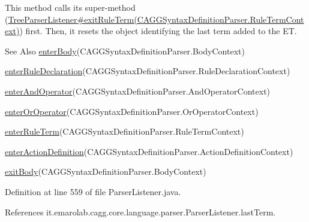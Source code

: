 This method calls its super-\/method (\hyperlink{}{Tree\-Parser\-Listener\#exit\-Rule\-Term(\-C\-A\-G\-G\-Syntax\-Definition\-Parser.\-Rule\-Term\-Context)}) first. Then, it resets the object identifying the last term added to the E\-T. \begin{DoxySeeAlso}{See Also}
\hyperlink{classit_1_1emarolab_1_1cagg_1_1core_1_1language_1_1parser_1_1ParserListener_a9675dd98156b94a9e26cea3946eaa69d}{enter\-Body}(C\-A\-G\-G\-Syntax\-Definition\-Parser.\-Body\-Context) 

\hyperlink{classit_1_1emarolab_1_1cagg_1_1core_1_1language_1_1parser_1_1ParserListener_a23734ed11648eae22a037a43e8c2d007}{enter\-Rule\-Declaration}(C\-A\-G\-G\-Syntax\-Definition\-Parser.\-Rule\-Declaration\-Context) 

\hyperlink{classit_1_1emarolab_1_1cagg_1_1core_1_1language_1_1parser_1_1ParserListener_a27394515e7347376dc937974202abbc9}{enter\-And\-Operator}(C\-A\-G\-G\-Syntax\-Definition\-Parser.\-And\-Operator\-Context) 

\hyperlink{classit_1_1emarolab_1_1cagg_1_1core_1_1language_1_1parser_1_1ParserListener_a0c20b78d0166b7fe8cf816764d9c7c86}{enter\-Or\-Operator}(C\-A\-G\-G\-Syntax\-Definition\-Parser.\-Or\-Operator\-Context) 

\hyperlink{classit_1_1emarolab_1_1cagg_1_1core_1_1language_1_1parser_1_1ParserListener_ab55244dd0bc74c42338389ef4f186963}{enter\-Rule\-Term}(C\-A\-G\-G\-Syntax\-Definition\-Parser.\-Rule\-Term\-Context) 

\hyperlink{classit_1_1emarolab_1_1cagg_1_1core_1_1language_1_1parser_1_1ParserListener_a95c6463441d582fef5d63aea4eb13f56}{enter\-Action\-Definition}(C\-A\-G\-G\-Syntax\-Definition\-Parser.\-Action\-Definition\-Context) 

\hyperlink{classit_1_1emarolab_1_1cagg_1_1core_1_1language_1_1parser_1_1ParserListener_a4ddc07fbccb866fee058db32839fba42}{exit\-Body}(C\-A\-G\-G\-Syntax\-Definition\-Parser.\-Body\-Context) 
\end{DoxySeeAlso}


Definition at line 559 of file Parser\-Listener.\-java.



References it.\-emarolab.\-cagg.\-core.\-language.\-parser.\-Parser\-Listener.\-last\-Term.

